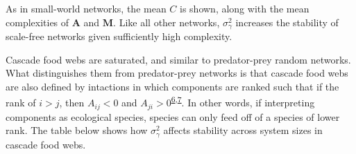 \documentclass[]{article}
\begin{document}
As in small-world networks, the mean \(C\) is shown, along with the mean
complexities of \(\mathbf{A}\) and \(\mathbf{M}\). Like all other
networks, \(\sigma^{2}_\gamma\) increases the stability of scale-free
networks given sufficiently high complexity.

Cascade food webs are saturated, and similar to predator-prey random
networks. What distinguishes them from predator-prey networks is that
cascade food webs are also defined by intactions in which components are
ranked such that if the rank of \(i > j\), then \(A_{ij} < 0\) and
\(A_{ji} > 0\)\textsuperscript{\protect\hyperlink{ref-Solow1998}{6},\protect\hyperlink{ref-Williams2000}{7}}.
In other words, if interpreting components as ecological species,
species can only feed off of a species of lower rank. The table below
shows how \(\sigma^{2}_\gamma\) affects stability across system sizes in
cascade food webs.
\end{document}
